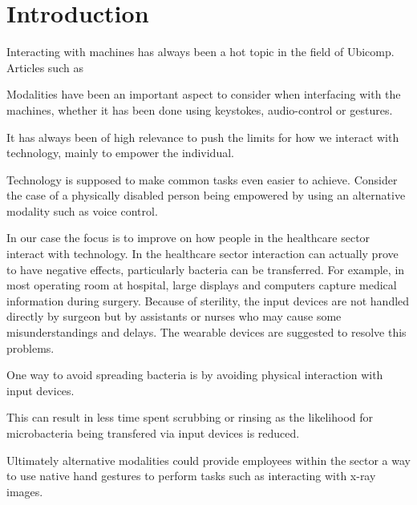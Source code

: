 \section{Introduction}
Interacting with machines has always been a hot topic in the field of Ubicomp.
Articles such as 

Modalities have been an important aspect
to consider when interfacing with the machines, whether it has been done using keystokes, audio-control or gestures.

It has always been of high relevance to push the limits for how we interact with technology, mainly to empower the individual.

Technology is supposed to make common tasks even easier to achieve. Consider the case of a physically disabled person being empowered by using an alternative modality such as voice control.

In our case the focus is to improve on how people in the healthcare sector interact with technology.
In the healthcare sector interaction can actually prove to have negative effects, particularly bacteria can be transferred.
For example, in most operating room at hospital, large displays and computers capture medical information during surgery. Because of sterility, the input devices are not handled directly by surgeon but by assistants or nurses who may cause some misunderstandings and delays\cite{Pederson:2015}. The wearable devices are suggested to resolve this problems.

One way to avoid spreading bacteria is by avoiding physical interaction with input devices.

This can result in less time spent scrubbing or rinsing as the likelihood for microbacteria being 
transfered via input devices is reduced.


Ultimately alternative modalities could provide employees within the sector a 
way to use native hand gestures to perform tasks such as interacting with x-ray images.
